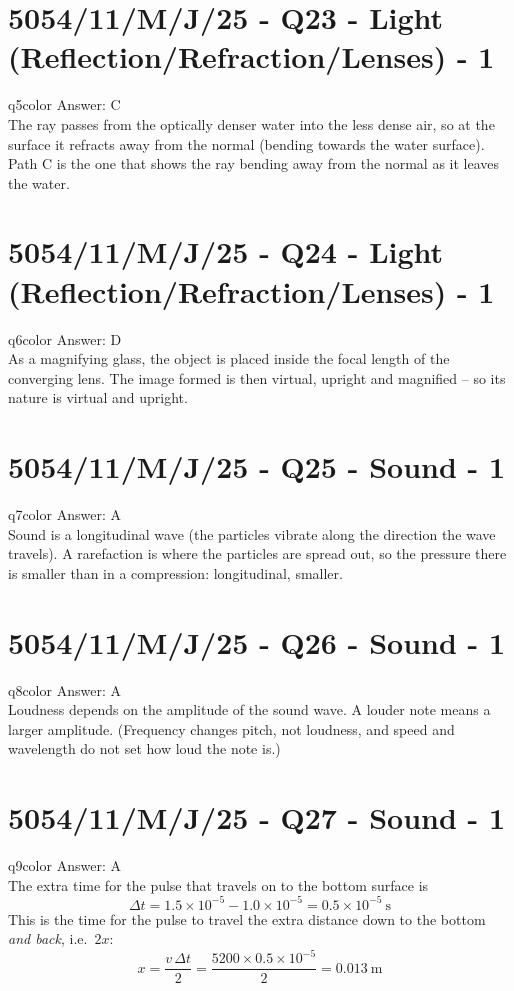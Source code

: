\documentclass[11pt,a4paper]{article}
\newcommand{\examq}[4]{\section[#1 - Q#2]{#1 - Q#2 - #3 - #4}}
\begin{document}
\examq{5054/11/M/J/25}{23}{Light (Reflection/Refraction/Lenses)}{1}

\begin{ansbox}{q5color}
Answer: $\boxed{\text{C}}$\\[4pt]
The ray passes from the optically denser water into the less dense air, so at the surface it refracts away from the normal (bending towards the water surface). Path C is the one that shows the ray bending away from the normal as it leaves the water.
\end{ansbox}

\examq{5054/11/M/J/25}{24}{Light (Reflection/Refraction/Lenses)}{1}

\begin{ansbox}{q6color}
Answer: $\boxed{\text{D}}$\\[4pt]
As a magnifying glass, the object is placed inside the focal length of the converging lens. The image formed is then virtual, upright and magnified -- so its nature is virtual and upright.
\end{ansbox}

\examq{5054/11/M/J/25}{25}{Sound}{1}

\begin{ansbox}{q7color}
Answer: $\boxed{\text{A}}$\\[4pt]
Sound is a longitudinal wave (the particles vibrate along the direction the wave travels). A rarefaction is where the particles are spread out, so the pressure there is smaller than in a compression: longitudinal, smaller.
\end{ansbox}

\examq{5054/11/M/J/25}{26}{Sound}{1}

\begin{ansbox}{q8color}
Answer: $\boxed{\text{A}}$\\[4pt]
Loudness depends on the amplitude of the sound wave. A louder note means a larger amplitude. (Frequency changes pitch, not loudness, and speed and wavelength do not set how loud the note is.)
\end{ansbox}

\examq{5054/11/M/J/25}{27}{Sound}{1}

\begin{ansbox}{q9color}
Answer: $\boxed{\text{A}}$\\[4pt]
The extra time for the pulse that travels on to the bottom surface is
\[
\Delta t = 1.5 \times 10^{-5} - 1.0 \times 10^{-5} = 0.5 \times 10^{-5}\ \mathrm{s}
\]
This is the time for the pulse to travel the extra distance down to the bottom \emph{and back}, i.e.\ $2x$:
\[
x = \frac{v\,\Delta t}{2} = \frac{5200 \times 0.5 \times 10^{-5}}{2} = \boxed{0.013\ \mathrm{m}}
\]
\end{ansbox}
\end{document}
